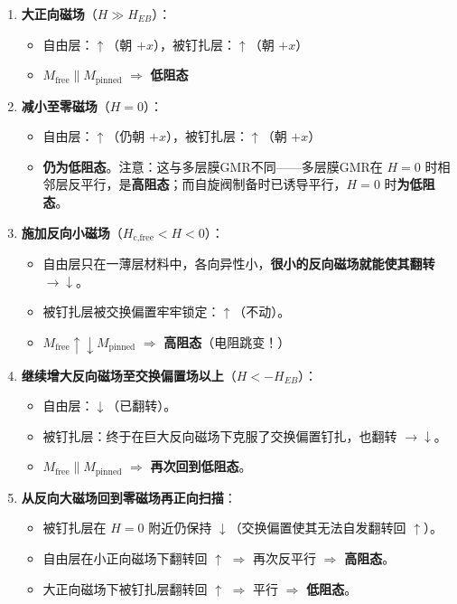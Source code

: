 \documentclass[12pt,a4paper]{article}
\begin{document}
\begin{enumerate}
    \item \textbf{大正向磁场}（$H \gg H_{EB}$）：
    \begin{itemize}
        \item 自由层：$\uparrow$（朝 $+x$），被钉扎层：$\uparrow$（朝 $+x$）
        \item $M_{\text{free}} \parallel M_{\text{pinned}}$ \quad $\Rightarrow$ \textbf{低阻态}
    \end{itemize}

    \item \textbf{减小至零磁场}（$H=0$）：
    \begin{itemize}
        \item 自由层：$\uparrow$（仍朝 $+x$），被钉扎层：$\uparrow$（朝 $+x$）
        \item \textbf{仍为低阻态}。注意：这与多层膜GMR不同——多层膜GMR在 $H=0$ 时相邻层反平行，是\textbf{高阻态}；而自旋阀制备时已诱导平行，$H=0$ 时\textbf{为低阻态}。
    \end{itemize}

    \item \textbf{施加反向小磁场}（$H_{\text{c,free}} < H < 0$）：
    \begin{itemize}
        \item 自由层只在一薄层材料中，各向异性小，\textbf{很小的反向磁场就能使其翻转}$\to \downarrow$。
        \item 被钉扎层被交换偏置牢牢锁定：$\uparrow$（不动）。
        \item $M_{\text{free}} \uparrow\downarrow M_{\text{pinned}}$ \quad $\Rightarrow$ \textbf{高阻态}（电阻跳变！）
    \end{itemize}

    \item \textbf{继续增大反向磁场至交换偏置场以上}（$H < -H_{EB}$）：
    \begin{itemize}
        \item 自由层：$\downarrow$（已翻转）。
        \item 被钉扎层：终于在巨大反向磁场下克服了交换偏置钉扎，也翻转 $\to \downarrow$。
        \item $M_{\text{free}} \parallel M_{\text{pinned}}$ \quad $\Rightarrow$ \textbf{再次回到低阻态}。
    \end{itemize}

    \item \textbf{从反向大磁场回到零磁场再正向扫描}：
    \begin{itemize}
        \item 被钉扎层在 $H=0$ 附近仍保持 $\downarrow$（交换偏置使其无法自发翻转回 $\uparrow$）。
        \item 自由层在小正向磁场下翻转回 $\uparrow$ \quad $\Rightarrow$ 再次反平行 \quad $\Rightarrow$ \textbf{高阻态}。
        \item 大正向磁场下被钉扎层翻转回 $\uparrow$ \quad $\Rightarrow$ 平行 \quad $\Rightarrow$ \textbf{低阻态}。
    \end{itemize}
\end{enumerate}
\end{document}
